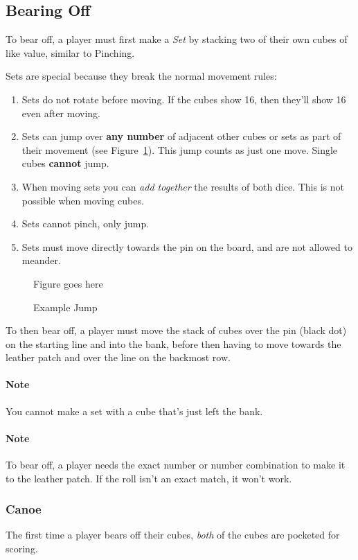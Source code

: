 \subsection{Bearing Off}\label{sec:bearing-off}
To bear off, a player must first make a \textit{Set} by stacking two of their own cubes of like value, similar to Pinching.

Sets are special because they break the normal movement rules:
\begin{enumerate}
    \item Sets do not rotate before moving. If the cubes show 16, then they'll show 16 even after moving.
    \item Sets can jump over \textbf{any number} of adjacent other cubes or sets as part of their movement (see Figure~\ref{fig:jump}). This jump counts as just one move. Single cubes \textbf{cannot} jump.
    \item When moving sets you can \textit{add together} the results of both dice. This is not possible when moving cubes.
    \item Sets cannot pinch, only jump.
    \item Sets must move directly towards the pin on the board, and are not allowed to meander.
\end{enumerate}
\begin{figure}[!h]
    \centering
    Figure goes here
    \caption{Example Jump}
    \label{fig:jump}
\end{figure}
To then bear off, a player must move the stack of cubes over the pin (black dot) on the starting line and into the bank, before then having to move towards the leather patch and over the line on the backmost row.

\paragraph{Note} You cannot make a set with a cube that's just left the bank.

\paragraph{Note} To bear off, a player needs the exact number or number combination to make it to the leather patch. If the roll isn't an exact match, it won't work.

\subsubsection{Canoe}
The first time a player bears off their cubes, \textit{both} of the cubes are pocketed for scoring.

